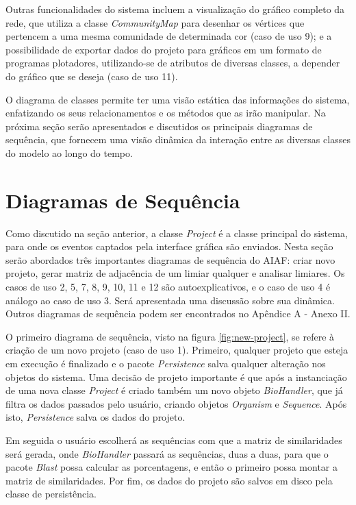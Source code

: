 Outras funcionalidades do sistema incluem a visualização do gráfico completo da rede, que utiliza a classe \textit{CommunityMap} para desenhar
os vértices que pertencem a uma mesma comunidade de determinada cor (caso de uso 9); e a possibilidade de exportar dados do projeto para
gráficos em um formato de programas plotadores, utilizando-se de atributos de diversas classes, a depender do gráfico que se deseja (caso de uso 11).

O diagrama de classes permite ter uma visão estática das informações do sistema, enfatizando os seus relacionamentos e os métodos que as irão manipular.
Na próxima seção serão apresentados e discutidos os principais diagramas de sequência, que fornecem uma visão dinâmica da interação entre as diversas
classes do modelo ao longo do tempo.

\section{Diagramas de Sequência} \label{sec:dinamica}

Como discutido na seção anterior, a classe \textit{Project} é a classe principal do sistema, para onde os eventos captados pela interface gráfica são
enviados. Nesta seção serão abordados três importantes diagramas de sequência do AIAF: criar novo projeto, gerar matriz de adjacência de um limiar qualquer
e analisar limiares. Os casos de uso 2, 5, 7, 8, 9, 10, 11 e 12 são autoexplicativos, e o caso de uso 4 é análogo ao caso de uso 3. Será
apresentada uma discussão sobre sua dinâmica. Outros diagramas de sequência podem ser encontrados no Apêndice A - Anexo II.

O primeiro diagrama de sequência, visto na figura \ref{fig:new-project}, se refere à criação de um novo projeto (caso de uso 1). Primeiro, qualquer projeto
que esteja em execução é finalizado e o pacote \textit{Persistence} salva qualquer alteração nos objetos do sistema. Uma decisão de projeto importante
é que após a instanciação de uma nova classe \textit{Project} é criado também um novo objeto \textit{BioHandler}, que já filtra os dados passados pelo
usuário, criando objetos \textit{Organism} e \textit{Sequence}. Após isto, \textit{Persistence} salva os dados do projeto.

Em seguida o usuário escolherá as sequências com que a matriz de similaridades será gerada, onde \textit{BioHandler} passará as sequências, duas a duas,
para que o pacote \textit{Blast} possa calcular as porcentagens, e então o primeiro possa montar a matriz de similaridades. Por fim, os dados do projeto
são salvos em disco pela classe de persistência.

